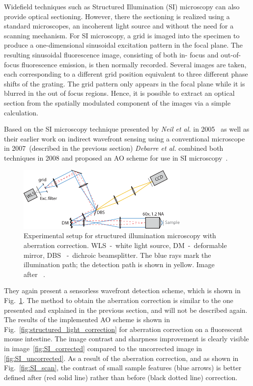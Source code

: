 Widefield techniques such as Structured Illumination (SI) microscopy can also provide optical sectioning. However, there the sectioning is realized using a standard microscopes, an incoherent light source and without the need for a scanning mechanism. For SI microscopy, a grid is imaged into the specimen to produce a one-dimensional sinusoidal excitation pattern in the focal plane. The resulting sinusoidal fluorescence image, consisting of both in- focus and out-of-focus fluorescence emission, is then normally recorded. Several images are taken, each corresponding to a different grid position equivalent to three different phase shifts of the grating. The grid pattern only appears in the focal plane while it is blurred in the out of focus regions. Hence, it is possible to extract an optical section from the spatially modulated component of the images via a simple calculation.

Based on the SI microscopy technique presented by \emph{Neil et al.} in 2005~\cite{wide_structured_illu_principle} as well as their earlier work on indirect wavefront sensing using a conventional microscope~\cite{wide_AOM_loew_freq} in 2007~(described in the previous section) \emph{Debarre et al.} combined both techniques in 2008 and proposed an AO scheme for use in SI microscopy~\cite{wide_AOM_structured_illu}.  

\begin{figure}[hbt]
	\centering
		\includegraphics[width=0.75\textwidth]{images/wide_structured_illumination.pdf}
	\caption{Experimental setup for structured illumination microscopy with 
aberration correction. WLS~-~white light source, DM~-~deformable mirror, DBS
~-~dichroic beamsplitter. The blue rays mark the illumination path; the 
detection path is shown in yellow. Image after~\cite{wide_AOM_structured_illu}
.}
	\label{fig:wide_structured_illumination}
\end{figure}

They again present a sensorless wavefront detection scheme, which is shown in Fig.~\ref{fig:wide_structured_illumination}. The method to obtain the aberration correction is similar to the one presented and explained in the previous section, and will not be described again. The results of the implemented AO scheme is shown in Fig.~\ref{fig:structured_light_correction} for aberration correction on a fluorescent mouse intestine. The image contrast and sharpness improvement is clearly visible in image~\ref{fig:SI_corrected} compared to the uncorrected image in \ref{fig:SI_uncorrected}. As a result of the aberration correction, and as shown in Fig.~\ref{fig:SI_scan}, the contrast of small sample features (blue arrows) is better defined after (red solid line) rather than before (black dotted line) correction. 


